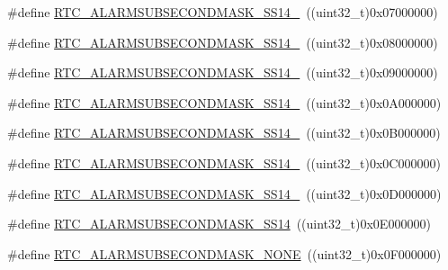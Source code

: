 \begin{DoxyCompactItemize}
\item 
\#define \hyperlink{group___r_t_c___alarm___sub___seconds___masks___definitions_gac0f57cb99c0a40708e3dd44eafa7f8e6}{R\+T\+C\+\_\+\+A\+L\+A\+R\+M\+S\+U\+B\+S\+E\+C\+O\+N\+D\+M\+A\+S\+K\+\_\+\+S\+S14\+\_}~((uint32\+\_\+t)0x07000000)
\item 
\#define \hyperlink{group___r_t_c___alarm___sub___seconds___masks___definitions_ga0f7cdfed3ad8bbe33fc2c4c2b8d5d2ce}{R\+T\+C\+\_\+\+A\+L\+A\+R\+M\+S\+U\+B\+S\+E\+C\+O\+N\+D\+M\+A\+S\+K\+\_\+\+S\+S14\+\_}~((uint32\+\_\+t)0x08000000)
\item 
\#define \hyperlink{group___r_t_c___alarm___sub___seconds___masks___definitions_ga173d153f6543cd34062d8ca14fb04975}{R\+T\+C\+\_\+\+A\+L\+A\+R\+M\+S\+U\+B\+S\+E\+C\+O\+N\+D\+M\+A\+S\+K\+\_\+\+S\+S14\+\_}~((uint32\+\_\+t)0x09000000)
\item 
\#define \hyperlink{group___r_t_c___alarm___sub___seconds___masks___definitions_ga7cb4d4abdac134b508cbb6e9b5d21638}{R\+T\+C\+\_\+\+A\+L\+A\+R\+M\+S\+U\+B\+S\+E\+C\+O\+N\+D\+M\+A\+S\+K\+\_\+\+S\+S14\+\_}~((uint32\+\_\+t)0x0\+A000000)
\item 
\#define \hyperlink{group___r_t_c___alarm___sub___seconds___masks___definitions_gaf67fcaa5c58e46e47d97be746c9dec24}{R\+T\+C\+\_\+\+A\+L\+A\+R\+M\+S\+U\+B\+S\+E\+C\+O\+N\+D\+M\+A\+S\+K\+\_\+\+S\+S14\+\_}~((uint32\+\_\+t)0x0\+B000000)
\item 
\#define \hyperlink{group___r_t_c___alarm___sub___seconds___masks___definitions_ga37c03d1ef098287fa559af1a28bd8ba5}{R\+T\+C\+\_\+\+A\+L\+A\+R\+M\+S\+U\+B\+S\+E\+C\+O\+N\+D\+M\+A\+S\+K\+\_\+\+S\+S14\+\_}~((uint32\+\_\+t)0x0\+C000000)
\item 
\#define \hyperlink{group___r_t_c___alarm___sub___seconds___masks___definitions_gada3b5b45dbdabf604340b0c09bdbdc2c}{R\+T\+C\+\_\+\+A\+L\+A\+R\+M\+S\+U\+B\+S\+E\+C\+O\+N\+D\+M\+A\+S\+K\+\_\+\+S\+S14\+\_}~((uint32\+\_\+t)0x0\+D000000)
\item 
\#define \hyperlink{group___r_t_c___alarm___sub___seconds___masks___definitions_ga91e1225dc11de4ce4bd74eb18fc155f7}{R\+T\+C\+\_\+\+A\+L\+A\+R\+M\+S\+U\+B\+S\+E\+C\+O\+N\+D\+M\+A\+S\+K\+\_\+\+S\+S14}~((uint32\+\_\+t)0x0\+E000000)
\item 
\#define \hyperlink{group___r_t_c___alarm___sub___seconds___masks___definitions_ga2c3802d48626766a3fc85ad910caea02}{R\+T\+C\+\_\+\+A\+L\+A\+R\+M\+S\+U\+B\+S\+E\+C\+O\+N\+D\+M\+A\+S\+K\+\_\+\+N\+O\+NE}~((uint32\+\_\+t)0x0\+F000000)
\end{DoxyCompactItemize}


